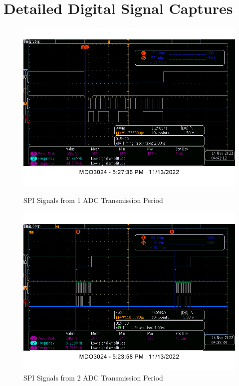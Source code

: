 \documentclass[conference]{IEEEtran}
\begin{document}
\section{Detailed Digital Signal Captures}
\begin{figure}[!htbp]
    \centerline{\includegraphics[width=0.7\linewidth]{Figures/SPI/adc_dig_one_cycle.png}}
    \caption{SPI Signals from 1 ADC Transmission Period}
    \label{ADC_1}
    \centerline{\includegraphics[width=0.7\linewidth]{Figures/SPI/adc_dig_two_cycle.png}}
    \caption{SPI Signals from 2 ADC Transmission Period}
    \label{ADC_2}
\end{figure}
\end{document}
